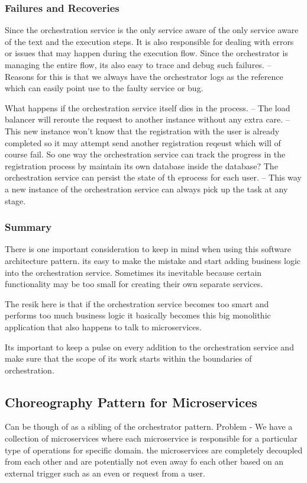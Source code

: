 \subsubsection{Failures and Recoveries}
Since the orchestration service is the only service aware of the only service aware of the text and the execution steps.
It is also responsible for dealing with errors or issues that may happen during the execution flow.
Since the orchestrator is managing the entire flow, its also easy to trace and debug such failures.
-- Reasons for this is that we always have the orchestrator logs as the reference which can easily point use to the faulty service or bug.

What happens if the orchestration service itself dies in the process.
-- The load balancer will reroute the request to another instance without any extra care.
-- This new instance won't know that the registration with the user is already completed so it may attempt send another registration reqeust which will of course fail.
So one way the orchestration service can track the progress in the registration process by maintain its own database inside the database?
The orchestration service can persist the state of th eprocess for each user.
-- This way a new instance of the orchestration service can always pick up the task at any stage.

\subsubsection{Summary}
There is one important consideration to keep in mind when using this software architecture pattern.
its easy to make the mistake and start adding business logic into the orchestration service.
Sometimes its inevitable because certain functionality may be too small for creating their own separate services.

The resik here is that if the orchestration service becomes too smart and performs too much business logic it basically becomes this big monolithic application that also happens to talk to microservices.

Its important to keep a pulse on every addition to the orchestration service and make sure that the scope of its work starts within the boundaries of orchestration.

\subsection{Choreography Pattern for Microservices}
Can be though of as a sibling of the orchestrator pattern.
Problem - We have a collection of microservices where each microservice is responsible for a particular type of operations for specific domain.
the microservices are completely decoupled from each other and are potentially not even away fo each other based on an external trigger such as an even or request from a user.

